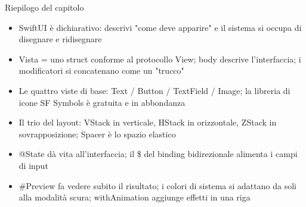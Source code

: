 \begin{tcbsummary}{Riepilogo del capitolo}
\begin{itemize}
  \item SwiftUI è dichiarativo: descrivi "come deve apparire" e il sistema si occupa di disegnare e ridisegnare
  \item Vista = uno struct conforme al protocollo View; body descrive l'interfaccia; i modificatori si concatenano come un "trucco"
  \item Le quattro viste di base: Text / Button / TextField / Image; la libreria di icone SF Symbols è gratuita e in abbondanza
  \item Il trio del layout: VStack in verticale, HStack in orizzontale, ZStack in sovrapposizione; Spacer è lo spazio elastico
  \item @State dà vita all'interfaccia; il \$ del binding bidirezionale alimenta i campi di input
  \item \#Preview fa vedere subito il risultato; i colori di sistema si adattano da soli alla modalità scura; withAnimation aggiunge effetti in una riga
\end{itemize}

\end{tcbsummary}
